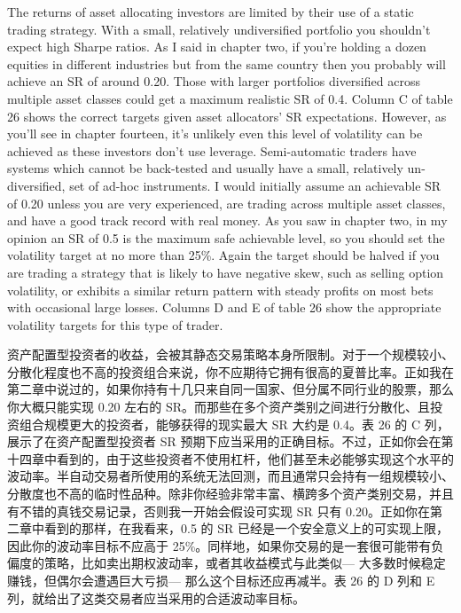 \begin{englishblock} The returns of asset allocating investors are limited by their use of a static trading strategy. With a small, relatively undiversified portfolio you shouldn't expect high Sharpe ratios. As I said in chapter two, if you're holding a dozen equities in different industries but from the same country then you probably will achieve an SR of around 0.20. Those with larger portfolios diversified across multiple asset classes could get a maximum realistic SR of 0.4. Column C of table 26 shows the correct targets given asset allocators' SR expectations. However, as you'll see in chapter fourteen, it's unlikely even this level of volatility can be achieved as these investors don't use leverage. Semi-automatic traders have systems which cannot be back-tested and usually have a small, relatively un-diversified, set of ad-hoc instruments. I would initially assume an achievable SR of 0.20 unless you are very experienced, are trading across multiple asset classes, and have a good track record with real money. As you saw in chapter two, in my opinion an SR of 0.5 is the maximum safe achievable level, so you should set the volatility target at no more than 25\%. Again the target should be halved if you are trading a strategy that is likely to have negative skew, such as selling option volatility, or exhibits a similar return pattern with steady profits on most bets with occasional large losses. Columns D and E of table 26 show the appropriate volatility targets for this type of trader. \end{englishblock}

\begin{chineseblock}资产配置型投资者的收益，会被其静态交易策略本身所限制。对于一个规模较小、分散化程度也不高的投资组合来说，你不应期待它拥有很高的夏普比率。正如我在第二章中说过的，如果你持有十几只来自同一国家、但分属不同行业的股票，那么你大概只能实现 0.20 左右的 SR。而那些在多个资产类别之间进行分散化、且投资组合规模更大的投资者，能够获得的现实最大 SR 大约是 0.4。表 26 的 C 列，展示了在资产配置型投资者 SR 预期下应当采用的正确目标。不过，正如你会在第十四章中看到的，由于这些投资者不使用杠杆，他们甚至未必能够实现这个水平的波动率。半自动交易者所使用的系统无法回测，而且通常只会持有一组规模较小、分散度也不高的临时性品种。除非你经验非常丰富、横跨多个资产类别交易，并且有不错的真钱交易记录，否则我一开始会假设可实现 SR 只有 0.20。正如你在第二章中看到的那样，在我看来，0.5 的 SR 已经是一个安全意义上的可实现上限，因此你的波动率目标不应高于 25\%。同样地，如果你交易的是一套很可能带有负偏度的策略，比如卖出期权波动率，或者其收益模式与此类似--- 大多数时候稳定赚钱，但偶尔会遭遇巨大亏损--- 那么这个目标还应再减半。表 26 的 D 列和 E 列，就给出了这类交易者应当采用的合适波动率目标。\end{chineseblock}

